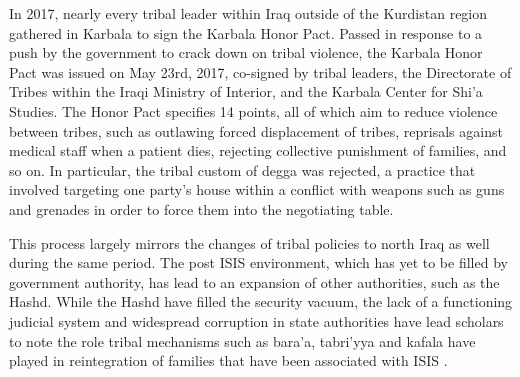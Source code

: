 



In 2017, nearly every tribal leader within Iraq outside of the Kurdistan region gathered in Karbala to sign the Karbala Honor Pact. Passed in response to a push by the government to crack down on tribal violence, the Karbala Honor Pact was issued on May 23rd, 2017, co-signed by tribal leaders, the Directorate of Tribes within the Iraqi Ministry of Interior, and the Karbala Center for Shi'a Studies. The Honor Pact specifies 14 points, all of which aim to reduce violence between tribes, such as outlawing forced displacement of tribes, reprisals against medical staff when a patient dies, rejecting collective punishment of families, and so on. In particular, the tribal custom of degga was rejected, a practice that involved targeting one party's house within a conflict with weapons such as guns and grenades in order to force them into the negotiating table. 

This process largely mirrors the changes of tribal policies to north Iraq as well during the same period. The post ISIS environment, which has yet to be filled by government authority, has lead to an expansion of other authorities, such as the Hashd. While the Hashd have filled the security vacuum, the lack of a functioning judicial system and widespread corruption in state authorities have lead scholars to note the role tribal mechanisms such as bara'a, tabri'yya and kafala have played in reintegration of families that have been associated with ISIS \cite{genat_state_nodate}.  

